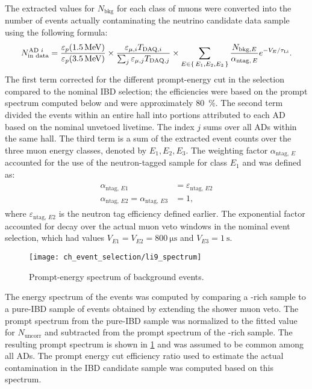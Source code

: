 The extracted values for $N_\text{bkg}$ for each class of muons
were converted into the number of \li{} events
actually contaminating the neutrino candidate data sample
using the following formula:
\begin{equation}\label{eq:li9_rate_conv}
    N_\text{in data}^{\text{AD }i} =
    \frac{\varepsilon_p(\SI{1.5}{\MeV})}{\varepsilon_p(\SI{3.5}{\MeV})}
    \times
    \frac{\varepsilon_{\mu,i} T_{\text{DAQ},i}}{
        \sum_j \varepsilon_{\mu,j} T_{\text{DAQ},j}
    }
    \times
    \sum_{E\in\set{E_1,E_2,E_3}}
    \frac{N_{\text{bkg},E}}{\alpha_{\text{ntag},\,E}} e^{-V_E/\tau_{\text{Li}}}.
\end{equation}
The first term corrected for the different prompt-energy cut
in the \li{} selection compared to the nominal IBD selection;
the efficiencies were based on the \li{} prompt spectrum computed below
and were approximately \SI{80}{\percent}.
The second term divided the events within an entire hall
into portions attributed to each AD based on the nominal unvetoed livetime.
The index $j$ sums over all ADs within the same hall.
The third term is a sum of the extracted event counts
over the three muon energy classes, denoted by $E_1,E_2,E_3$.
The weighting factor $\alpha_{\text{ntag},\,E}$ accounted
for the use of the neutron-tagged sample for class $E_1$
and was defined as:
\begin{align}
    \begin{split}
        \alpha_{\text{ntag},\,E1} &= \varepsilon_{\text{ntag},\,E2} \\
        \alpha_{\text{ntag},\,E2} = \alpha_{\text{ntag},\,E3} &= 1,
    \end{split}
\end{align}
where $\varepsilon_{\text{ntag},\,E2}$ is the neutron tag efficiency defined earlier.
The exponential factor accounted for \li{} decay
over the actual muon veto windows in the nominal event selection,
which had values $V_{E1} = V_{E2} = \SI{800}{\us}$
and $V_{E3} = \SI{1}{\s}$.

\begin{figure}
    \centering
    \texttt{[image: ch\_event\_selection/li9\_spectrum]}
    \caption{
        Prompt-energy spectrum of \li{} background events.
    }
    \label{fig:li9_spec}
\end{figure}

The energy spectrum of the \li{} events was computed
by comparing a \li{}-rich sample to a pure-IBD sample of events
obtained by extending the shower muon veto.
The prompt spectrum from the pure-IBD sample
was normalized to the fitted value for $N_\text{uncorr}$
and subtracted from the prompt spectrum of the \li{}-rich sample.
The resulting \li{} prompt spectrum is shown in \cref{fig:li9_spec}
and was assumed to be common among all ADs.
The prompt energy cut efficiency ratio
used to estimate the actual contamination in the IBD candidate sample
was computed based on this spectrum.

